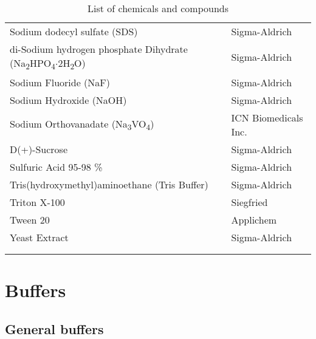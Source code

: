 \begin{center}
\begin{longtable}{l l}
Sodium dodecyl sulfate (SDS) & Sigma-Aldrich\\
di-Sodium hydrogen phosphate Dihydrate (Na\textsubscript{2}HPO\textsubscript{4}$\cdot$2H\textsubscript{2}O) & Sigma-Aldrich\\
Sodium Fluoride (NaF) & Sigma-Aldrich\\
Sodium Hydroxide (NaOH) & Sigma-Aldrich \\
Sodium Orthovanadate (Na\textsubscript{3}VO\textsubscript{4}) & ICN Biomedicals Inc.\\ 
D(+)-Sucrose & Sigma-Aldrich \\
Sulfuric Acid 95-98 \% & Sigma-Aldrich\\
Tris(hydroxymethyl)aminoethane (Tris Buffer) & Sigma-Aldrich \\
Triton X-100 & Siegfried \\
Tween 20 & Applichem \\
Yeast Extract & Sigma-Aldrich \\

\caption[Chemicals and compounds]{List of chemicals and compounds}\\

\label{Chemicals}
\end{longtable}

\end{center}



\section{Buffers}

\subsection{General buffers}

